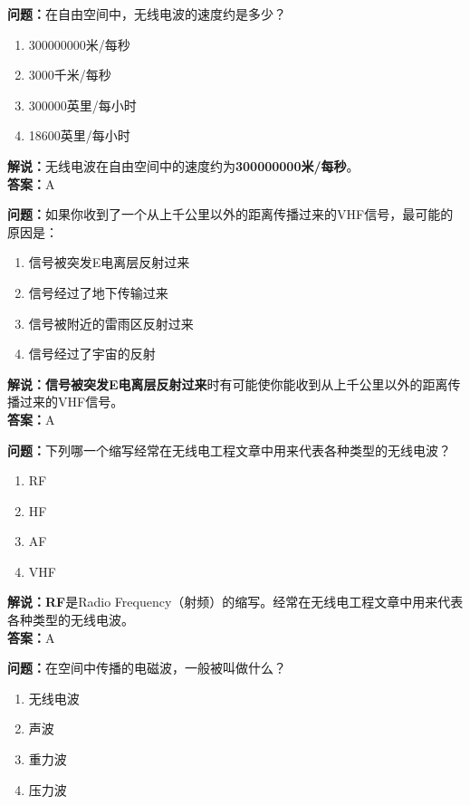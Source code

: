\textbf{问题：}在自由空间中，无线电波的速度约是多少？

\begin{enumerate}[label=\Alph*), leftmargin=1.5cm]
	\item 300000000米/每秒
	\item 3000千米/每秒
	\item 300000英里/每小时
	\item 18600英里/每小时
\end{enumerate}

\textbf{解说：}无线电波在自由空间中的速度约为\textbf{300000000米/每秒}。\\\textbf{答案：}A



\textbf{问题：}如果你收到了一个从上千公里以外的距离传播过来的VHF信号，最可能的原因是：

\begin{enumerate}[label=\Alph*), leftmargin=1.5cm]
	\item 信号被突发E电离层反射过来
	\item 信号经过了地下传输过来
	\item 信号被附近的雷雨区反射过来
	\item 信号经过了宇宙的反射
\end{enumerate}

\textbf{解说：信号被突发E电离层反射过来}时有可能使你能收到从上千公里以外的距离传播过来的VHF信号。\\\textbf{答案：}A



\textbf{问题：}下列哪一个缩写经常在无线电工程文章中用来代表各种类型的无线电波？

\begin{enumerate}[label=\Alph*), leftmargin=1.5cm]
	\item RF
	\item HF
	\item AF
	\item VHF
\end{enumerate}

\textbf{解说：RF}是Radio Frequency（射频）的缩写。经常在无线电工程文章中用来代表各种类型的无线电波。\\\textbf{答案：}A



\textbf{问题：}在空间中传播的电磁波，一般被叫做什么？

\begin{enumerate}[label=\Alph*), leftmargin=1.5cm]
	\item 无线电波
	\item 声波
	\item 重力波
	\item 压力波
\end{enumerate}

